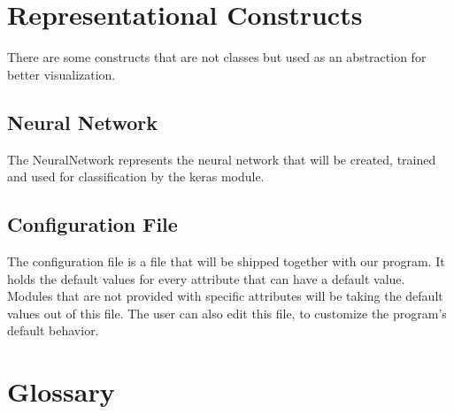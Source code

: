 \documentclass[parskip=full]{scrartcl}
\begin{document}
\section{Representational Constructs}
There are some constructs that are not classes but used as an abstraction for better visualization.

\subsection{Neural Network}
The NeuralNetwork represents the \gls{neural network} that will be created, trained and used for classification by the keras module.

\subsection{Configuration File}
The configuration file is a file that will be shipped together with our program.
It holds the default values for every attribute that can have a default value.
Modules that are not provided with specific attributes will be taking the default values out of this file.
The user can also edit this file, to customize the program's default behavior.


\newpage
\section{Glossary}

\printnoidxglossaries
\end{document}
